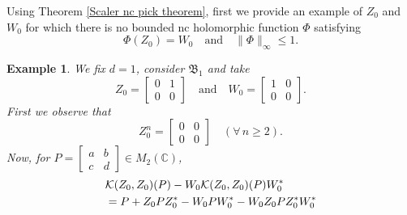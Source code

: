 \documentclass[12pt]{amsart}%
\newtheorem{example}[theorem]{Example}
\numberwithin{equation}{section}
\newcommand{\fB}{{\mathfrak{B}}}
\newcommand{\clk}{\mathcal{K}}
\newcommand{\C}{\mathbb{C}}
\begin{document}
Using Theorem \ref{Scaler nc pick theorem}, first we provide an example of $Z_0$ and $W_0$ for which there is no bounded nc holomorphic function $\Phi$ satisfying \[\Phi(Z_0)=W_0\quad\text{and}\quad\|\Phi\|_\infty\leq 1.\] 
\begin{example}
We fix $d=1$, consider $\fB_1$ and take
\[Z_0=\begin{bmatrix}0&1\\0&0\end{bmatrix} \quad \text{and} \quad W_0=\begin{bmatrix}1&0\\0&0\end{bmatrix}.\]
First we observe that $$Z^n_0= \begin{bmatrix}0&0\\0 &0\end{bmatrix}\quad (\forall\, n\geq 2).$$
Now, for $P= \begin{bmatrix}a&b\\c &d\end{bmatrix}\in M_2(\C)$,
\allowdisplaybreaks
\begingroup
\begin{align*}&\clk(Z_0, Z_0)(P)-W_0\clk(Z_0, Z_0)(P) W_0^* \\
\vspace{0.2cm}&=P+ Z_0P Z^*_0- W_0 P W^*_0 -W_0 Z_0 P Z^*_0 W^*_0 \\

\end{align*}
\end{example}
\end{document}
